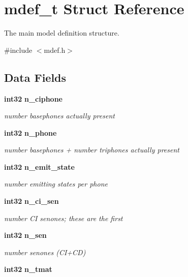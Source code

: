 \section{mdef\-\_\-t \-Struct \-Reference}
\label{structmdef__t}


\-The main model definition structure.  




{\ttfamily \#include $<$mdef.\-h$>$}

\subsection*{\-Data \-Fields}
\begin{DoxyCompactItemize}
\item 
{\bf int32} {\bf n\-\_\-ciphone}\label{structmdef__t_af460d8d703782cf50ed99164cee17347}

\begin{DoxyCompactList}\small\item\em number basephones actually present \end{DoxyCompactList}\item 
{\bf int32} {\bf n\-\_\-phone}\label{structmdef__t_a987f0b9bc4c951ac031f5d283960bd9f}

\begin{DoxyCompactList}\small\item\em number basephones + number triphones actually present \end{DoxyCompactList}\item 
{\bf int32} {\bf n\-\_\-emit\-\_\-state}\label{structmdef__t_a4a7ffa9d1b9a95a3bf3cca7bd955020a}

\begin{DoxyCompactList}\small\item\em number emitting states per phone \end{DoxyCompactList}\item 
{\bf int32} {\bf n\-\_\-ci\-\_\-sen}\label{structmdef__t_a68c3cc85b849363609fd5dadf412a38c}

\begin{DoxyCompactList}\small\item\em number \-C\-I senones; these are the first \end{DoxyCompactList}\item 
{\bf int32} {\bf n\-\_\-sen}\label{structmdef__t_a966e28ae25bd8e766dbe81549cbdcd36}

\begin{DoxyCompactList}\small\item\em number senones (\-C\-I+\-C\-D) \end{DoxyCompactList}\item 
{\bf int32} {\bf n\-\_\-tmat}\label{structmdef__t_a44d1d9fd99db66f1c37937e89172fed9}


\end{DoxyCompactItemize}
